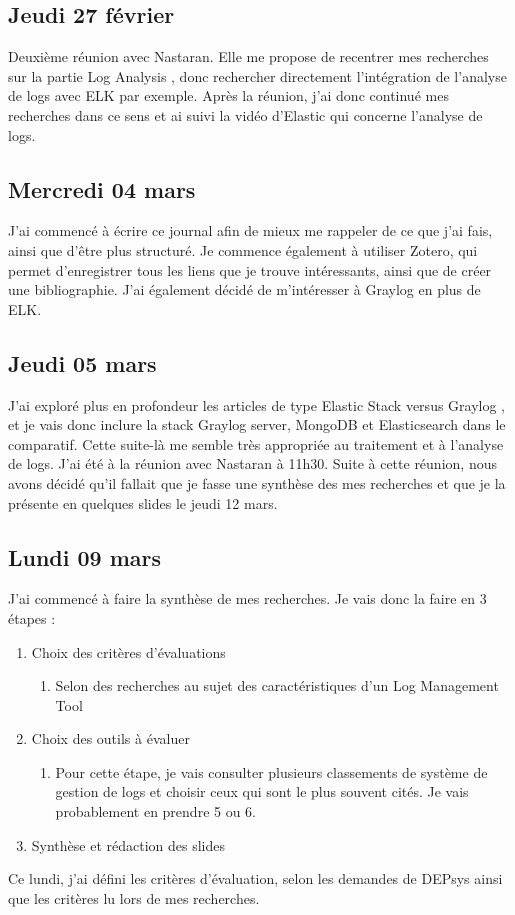 \documentclass[paper=a4, fontsize=11pt]{scrartcl}
\begin{document}
\subsection{Jeudi 27 février}
    Deuxième réunion avec Nastaran. Elle me propose de recentrer mes recherches sur la partie \og Log Analysis \fg, donc rechercher directement l'intégration de l'analyse de logs avec ELK par exemple. Après la réunion, j'ai donc continué mes recherches dans ce sens et ai suivi la vidéo d'Elastic qui concerne l'analyse de logs.
\subsection{Mercredi 04 mars}
    J'ai commencé à écrire ce journal afin de mieux me rappeler de ce que j'ai fais, ainsi que d'être plus structuré. Je commence également à utiliser Zotero, qui permet d'enregistrer tous les liens que je trouve intéressants, ainsi que de créer une bibliographie. J'ai également décidé de m'intéresser à Graylog en plus de ELK.
\subsection{Jeudi 05 mars}
    J'ai exploré plus en profondeur les articles de type \og Elastic Stack versus Graylog \fg, et je vais donc inclure la stack \og Graylog server, MongoDB et Elasticsearch \fg dans le comparatif. Cette suite-là me semble très appropriée au traitement et à l'analyse de logs.
    J'ai été à la réunion avec Nastaran à 11h30. Suite à cette réunion, nous avons décidé qu'il fallait que je fasse une synthèse des mes recherches et que je la présente en quelques slides le jeudi 12 mars.
\subsection{Lundi 09 mars}
    J'ai commencé à faire la synthèse de mes recherches. Je vais donc la faire en 3 étapes :
    \begin{enumerate}
    \item Choix des critères d'évaluations
        \begin{enumerate}
            \item Selon des recherches au sujet des caractéristiques d'un \og Log Management Tool \fg
        \end{enumerate}
    \item Choix des outils à évaluer
        \begin{enumerate}
                \item Pour cette étape, je vais consulter plusieurs classements de système de gestion de logs et choisir ceux qui sont le plus souvent cités. Je vais probablement en prendre 5 ou 6.
        \end{enumerate}
    \item Synthèse et rédaction des slides
    \end{enumerate}
    Ce lundi, j'ai défini les critères d'évaluation, selon les demandes de DEPsys ainsi que les critères lu lors de mes recherches.
\end{document}
